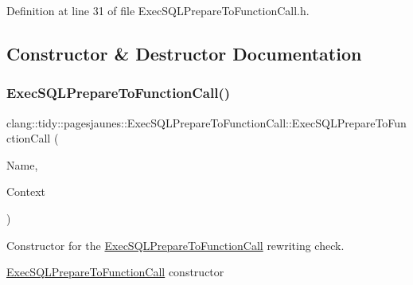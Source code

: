 Definition at line 31 of file Exec\+S\+Q\+L\+Prepare\+To\+Function\+Call.\+h.



\subsection{Constructor \& Destructor Documentation}
\mbox{\label{classclang_1_1tidy_1_1pagesjaunes_1_1_exec_s_q_l_prepare_to_function_call_a7075e59992f7f1c53938e30d7f6831e5}} 
\subsubsection{\texorpdfstring{Exec\+S\+Q\+L\+Prepare\+To\+Function\+Call()}{ExecSQLPrepareToFunctionCall()}}
{\footnotesize\ttfamily clang\+::tidy\+::pagesjaunes\+::\+Exec\+S\+Q\+L\+Prepare\+To\+Function\+Call\+::\+Exec\+S\+Q\+L\+Prepare\+To\+Function\+Call (\begin{DoxyParamCaption}\item[{String\+Ref}]{Name,  }\item[{Clang\+Tidy\+Context $\ast$}]{Context }\end{DoxyParamCaption})}



Constructor for the \hyperlink{classclang_1_1tidy_1_1pagesjaunes_1_1_exec_s_q_l_prepare_to_function_call}{Exec\+S\+Q\+L\+Prepare\+To\+Function\+Call} rewriting check. 

\hyperlink{classclang_1_1tidy_1_1pagesjaunes_1_1_exec_s_q_l_prepare_to_function_call}{Exec\+S\+Q\+L\+Prepare\+To\+Function\+Call} constructor

